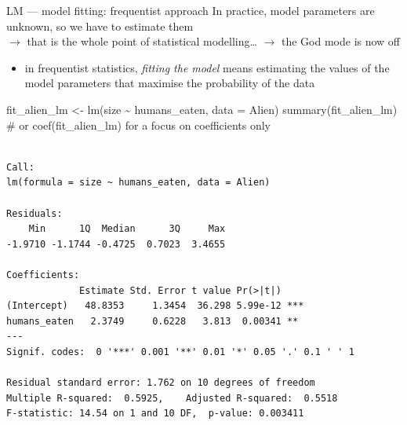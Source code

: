 \documentclass[
  10pt,
  ignorenonframetext,
  aspectratio=169,
  t]{beamer}
\newenvironment{Shaded}{\begin{snugshade}}{\end{snugshade}}
\newcommand{\AttributeTok}[1]{\textcolor[rgb]{0.40,0.45,0.13}{#1}}
\newcommand{\CommentTok}[1]{\textcolor[rgb]{0.37,0.37,0.37}{#1}}
\newcommand{\FunctionTok}[1]{\textcolor[rgb]{0.28,0.35,0.67}{#1}}
\newcommand{\NormalTok}[1]{\textcolor[rgb]{0.00,0.23,0.31}{#1}}
\newcommand{\OtherTok}[1]{\textcolor[rgb]{0.00,0.23,0.31}{#1}}
\newcommand{\SpecialCharTok}[1]{\textcolor[rgb]{0.37,0.37,0.37}{#1}}
\providecommand{\tightlist}{%
  \setlength{\itemsep}{0pt}\setlength{\parskip}{0pt}}
\newcommand{\bluenorm}[1]{\textcolor{bluebeamer}{#1}}
\newcommand{\blueit}[1]{\textcolor{bluebeamer}{\emph{#1}}}
\begin{document}
\begin{frame}[fragile]{LM --- model fitting: frequentist approach}
\protect{}\label{lm-model-fitting-frequentist-approach}
In practice, model parameters are \bluenorm{unknown}, so we have to
estimate them\\
\(\rightarrow\) that is the whole point of statistical modelling\ldots{}
\(\rightarrow\) the God mode is now off

\pause

\begin{itemize}
\tightlist
\item
  in frequentist statistics, \blueit{fitting the model} means estimating
  the values of the model parameters that maximise the probability of
  the data
\end{itemize}

\vspace{1em}

\footnotesize

\begin{Shaded}
\begin{Highlighting}[]
\NormalTok{fit\_alien\_lm }\OtherTok{\textless{}{-}} \FunctionTok{lm}\NormalTok{(size }\SpecialCharTok{\textasciitilde{}}\NormalTok{ humans\_eaten, }\AttributeTok{data =}\NormalTok{ Alien)}
\FunctionTok{summary}\NormalTok{(fit\_alien\_lm) }\CommentTok{\# or coef(fit\_alien\_lm) for a focus on coefficients only}
\end{Highlighting}
\end{Shaded}

\normalsize

\tiny

\begin{verbatim}

Call:
lm(formula = size ~ humans_eaten, data = Alien)

Residuals:
    Min      1Q  Median      3Q     Max 
-1.9710 -1.1744 -0.4725  0.7023  3.4655 

Coefficients:
             Estimate Std. Error t value Pr(>|t|)    
(Intercept)   48.8353     1.3454  36.298 5.99e-12 ***
humans_eaten   2.3749     0.6228   3.813  0.00341 ** 
---
Signif. codes:  0 '***' 0.001 '**' 0.01 '*' 0.05 '.' 0.1 ' ' 1

Residual standard error: 1.762 on 10 degrees of freedom
Multiple R-squared:  0.5925,    Adjusted R-squared:  0.5518 
F-statistic: 14.54 on 1 and 10 DF,  p-value: 0.003411
\end{verbatim}

\normalsize
\end{frame}
\end{document}

